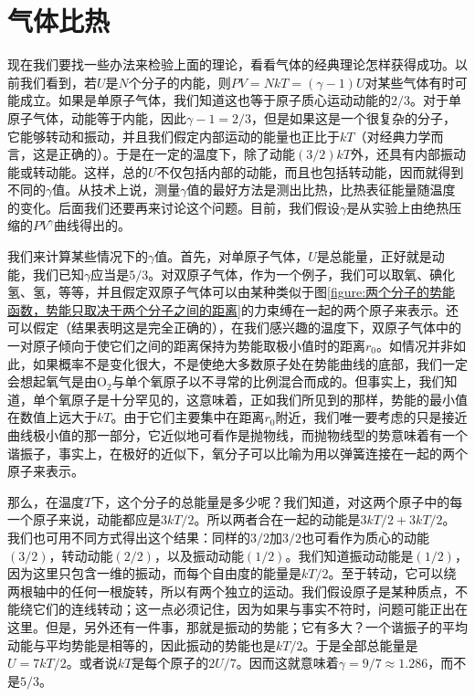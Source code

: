 \section{气体比热}

现在我们要找一些办法来检验上面的理论，看看气体的经典理论怎样获得成功。以前我们看到，若$U$是$N$个分子的内能，则$PV=NkT=(\gamma-1)U$对某些气体有时可能成立。如果是单原子气体，我们知道这也等于原子质心运动动能的$2/3$。对于单原子气体，动能等于内能，因此$\gamma-1=2/3$，但是如果这是一个很复杂的分子，它能够转动和振动，并且我们假定内部运动的能量也正比于$kT$（对经典力学而言，这是正确的）。于是在一定的温度下，除了动能$(3/2)kT$外，还具有内部振动能或转动能。这样，总的$U$不仅包括内部的动能，而且也包括转动能，因而就得到不同的$\gamma$值。从技术上说，测量$\gamma$值的最好方法是测出比热，比热表征能量随温度的变化。后面我们还要再来讨论这个问题。目前，我们假设$\gamma$是从实验上由绝热压缩的$PV^\gamma$曲线得出的。

我们来计算某些情况下的$\gamma$值。首先，对单原子气体，$U$是总能量，正好就是动能，我们已知$\gamma$应当是$5/3$。对双原子气体，作为一个例子，我们可以取氧、碘化氢、氢，等等，并且假定双原子气体可以由某种类似于图\ref{figure:两个分子的势能函数，势能只取决于两个分子之间的距离}的力束缚在一起的两个原子来表示。还可以假定（结果表明这是完全正确的），在我们感兴趣的温度下，双原子气体中的一对原子倾向于使它们之间的距离保持为势能取极小值时的距离$r_0$。如情况并非如此，如果概率不是变化很大，不是使绝大多数原子处在势能曲线的底部，我们一定会想起氧气是由O$_2$与单个氧原子以不寻常的比例混合而成的。但事实上，我们知道，单个氧原子是十分罕见的，这意味着，正如我们所见到的那样，势能的最小值在数值上远大于$kT$。由于它们主要集中在距离$r_0$附近，我们唯一要考虑的只是接近曲线极小值的那一部分，它近似地可看作是抛物线，而抛物线型的势意味着有一个谐振子，事实上，在极好的近似下，氧分子可以比喻为用以弹簧连接在一起的两个原子来表示。

那么，在温度$T$下，这个分子的总能量是多少呢？我们知道，对这两个原子中的每一个原子来说，动能都应是$3kT/2$。所以两者合在一起的动能是$3kT/2+3kT/2$。我们也可用不同方式得出这个结果：同样的$3/2$加$3/2$也可看作为质心的动能$(3/2)$，转动动能$(2/2)$，以及振动动能$(1/2)$。我们知道振动动能是$(1/2)$，因为这里只包含一维的振动，而每个自由度的能量是$kT/2$。至于转动，它可以绕两根轴中的任何一根旋转，所以有两个独立的运动。我们假设原子是某种质点，不能绕它们的连线转动；这一点必须记住，因为如果与事实不符时，问题可能正出在这里。但是，另外还有一件事，那就是振动的势能；它有多大？一个谐振子的平均动能与平均势能是相等的，因此振动的势能也是$kT/2$。于是全部总能量是$U=7kT/2$。或者说$kT$是每个原子的$2U/7$。因而这就意味着$\gamma=9/7\approx 1.286$，而不是$5/3$。


